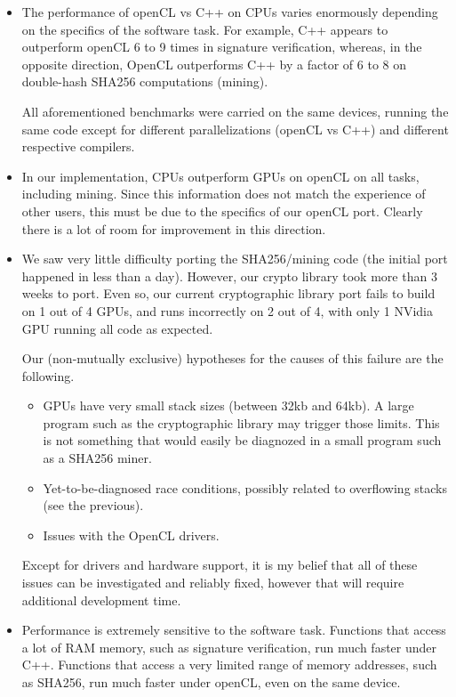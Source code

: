 \documentclass{article}
\begin{document}
\begin{itemize}
\item The performance of openCL vs C++ on CPUs varies enormously depending on the specifics of the software task. For example, C++ appears to outperform openCL 6 to 9 times in signature verification, whereas, in the opposite direction, OpenCL outperforms C++ by a factor of 6 to 8 on double-hash SHA256 computations (mining). 

All aforementioned benchmarks were carried on the same devices, running the same code except for different parallelizations (openCL vs C++) and different respective compilers.

\item In our implementation, CPUs outperform GPUs on openCL on all tasks, including mining. Since this information does not match the experience of other users, this must be due to the specifics of our openCL port. Clearly there is a lot of room for improvement in this direction.

\item We saw very little difficulty porting the SHA256/mining code (the initial port happened in less than a day). However, our crypto library took more than 3 weeks to port. Even so, our current cryptographic library port fails to build on 1 out of 4 GPUs, and runs incorrectly on 2 out of 4, with only 1 NVidia GPU running all code as expected. 

Our (non-mutually exclusive) hypotheses for the causes of this failure are the following.
\begin{itemize}
\item GPUs have very small stack sizes (between 32kb and 64kb). A large program such as the cryptographic library may trigger those limits. This is not something that would easily be diagnozed in a small program such as a SHA256 miner.

\item Yet-to-be-diagnosed race conditions, possibly related to overflowing stacks (see the previous).

\item Issues with the OpenCL drivers.

\end{itemize}

Except for drivers and hardware support, it is my belief that all of these issues can be investigated and reliably fixed, however that will require additional development time.

\item Performance is extremely sensitive to the software task. Functions that access a lot of RAM memory, such as signature verification, run much faster under C++. Functions that access a very limited range of memory addresses, such as SHA256, run much faster under openCL, even on the same device.


\end{itemize}
\end{document}
